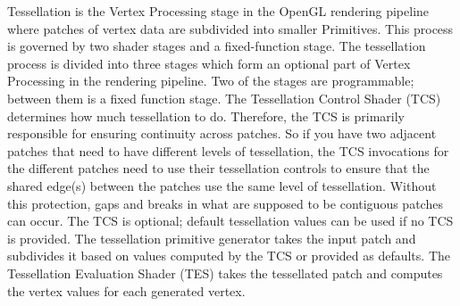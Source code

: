 \documentclass{report}
\begin{document}
Tessellation is the Vertex Processing stage in the OpenGL rendering pipeline where patches of
vertex data are subdivided into smaller Primitives. This process is governed by two shader stages
and a fixed-function stage. The tessellation process is divided into three stages which form an
optional part of Vertex Processing in the rendering pipeline. Two of the stages are programmable;
between them is a fixed function stage. The Tessellation Control Shader (TCS) determines how much
tessellation to do. Therefore, the TCS is primarily responsible for ensuring continuity across
patches. So if you have two adjacent patches that need to have different levels of tessellation,
the TCS invocations for the different patches need to use their tessellation controls to ensure
that the shared edge(s) between the patches use the same level of tessellation. Without this
protection, gaps and breaks in what are supposed to be contiguous patches can occur. The TCS is
optional; default tessellation values can be used if no TCS is provided. The tessellation primitive
generator takes the input patch and subdivides it based on values computed by the TCS or provided
as defaults. The Tessellation Evaluation Shader (TES) takes the tessellated patch and computes the
vertex values for each generated vertex.
\end{document}
